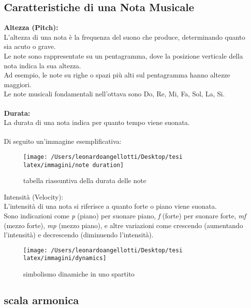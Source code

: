 \documentclass[a4paper,12pt]{report}
\begin{document}
\subsection{Caratteristiche di una Nota Musicale}

\textbf{Altezza (Pitch):} \\
L'altezza di una nota è la frequenza del suono che produce, determinando quanto sia acuto o grave. \\
Le note sono rappresentate su un pentagramma, dove la posizione verticale della nota indica la sua altezza. \\
Ad esempio, le note su righe o spazi più alti sul pentagramma hanno altezze maggiori. \\
Le note musicali fondamentali nell'ottava sono Do, Re, Mi, Fa, Sol, La, Si. \\
\\
\textbf{Durata:}\\
La durata di una nota indica per quanto tempo viene suonata. \\
\\
Di seguito un'immagine esemplificativa:

\begin{figure}[H]
    \centering
    \texttt{[image: /Users/leonardoangellotti/Desktop/tesi latex/immagini/note duration]} 
    \caption{tabella riassuntiva della durata delle note}
    \label{fig:immagine}
\end{figure}

Intensità (Velocity): \\
L'intensità di una nota si riferisce a quanto forte o piano viene suonata. \\
Sono indicazioni come \textit{p} (piano) per suonare piano, \textit{f} (forte) per suonare forte, \textit{mf} (mezzo forte), \textit{mp} (mezzo piano), e altre variazioni come crescendo (aumentando l'intensità) e decrescendo (diminuendo l'intensità).

\begin{figure}[H]
    \centering
    \texttt{[image: /Users/leonardoangellotti/Desktop/tesi latex/immagini/dynamics]} 
    \caption{simbolismo dinamiche in uno spartito}
    \label{fig:immagine}
\end{figure}

\subsection{scala armonica}
\end{document}
